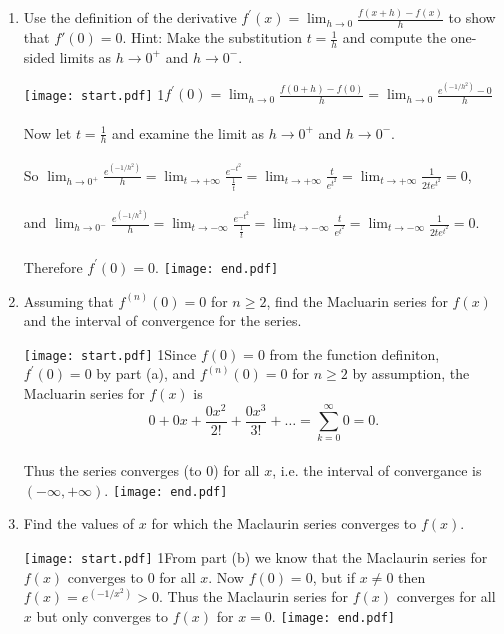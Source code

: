 \documentclass[12pt]{article}
\begin{document}
\begin{enumerate}
\begin{enumerate}

\item Use the definition of the derivative $f^{\prime}(x)=\lim_{h \to 0}{\tfrac{f(x+h)-f(x)}{h}}$ to show that $f'(0)=0$.  Hint:  Make the substitution $\textstyle t=\frac{1}{h}$ and compute the one-sided limits as $h \to 0^+$ and $h \to 0^-$.

\texttt{[image: start.pdf]}
{{{1\linewidth}{$f^{\prime}(0) = \lim_{h \to 0}{\frac{f(0+h)-f(0)}{h}} = \lim_{h \to 0}{\frac{e^{(-1/h^2)}-0}{h}}$
\\ \\ Now let $\textstyle t=\frac{1}{h}$ and examine the limit as $h \to 0^+$ and $h \to 0^-$.
\\ \\ So \text{ } $\lim_{h \to 0^+}{\frac{e^{(-1/h^2)}}{h}}=\lim_{t \to +\infty}{\frac{e^{-t^2}}{\frac{1}{t}}}=\lim_{t \to +\infty}{\frac{t}{e^{t^2}}}=\lim_{t \to +\infty}{\frac{1}{2te^{t^2}}}=0$, 
\\ \\ and $\lim_{h \to 0^-}{\frac{e^{(-1/h^2)}}{h}}=\lim_{t \to -\infty}{\frac{e^{-t^2}}{\frac{1}{t}}}=\lim_{t \to -\infty}{\frac{t}{e^{t^2}}}=\lim_{t \to -\infty}{\frac{1}{2te^{t^2}}}=0$.
\\ \\ Therefore $f^{\prime}(0)=0$. }}}
\texttt{[image: end.pdf]}


\item Assuming that $f^{(n)}(0)=0$ for $n \geq 2$, find the Macluarin series for $f(x)$ and the interval of convergence for the series.

\texttt{[image: start.pdf]}
{{{1\linewidth}{Since $f(0)=0$ from the function definiton, $f^{\prime}(0)=0$ by part (a), and $f^{(n)}(0)=0$ for $n \geq 2$ by assumption, the Macluarin series for $f(x)$ is $$0 + 0x + 
\frac{0x^2}{2!}+\frac{0x^3}{3!}+\ldots = \sum_{k=0}^{\infty}{0}=0.$$ \\Thus the series converges (to $0$) for all $x$, i.e. the interval of convergance is $(-\infty, +\infty)$.  }}}
\texttt{[image: end.pdf]}


\item Find the values of $x$ for which the Maclaurin series converges to $f(x)$.

\texttt{[image: start.pdf]}
{{{1\linewidth}{From part (b) we know that the Maclaurin series for $f(x)$ converges to $0$ for all $x$.  Now $f(0)=0$, but if $x \neq 0$ then $f(x)=e^{(-1/x^2)} > 0$.  Thus the 
Maclaurin series for $f(x)$ converges for all $x$ but only converges to $f(x)$ for $x=0$. }}}
\texttt{[image: end.pdf]}


\end{enumerate} 




\end{enumerate}
\end{document}
